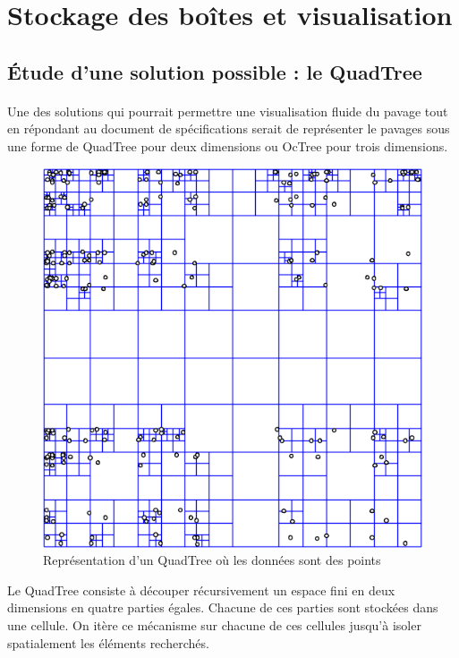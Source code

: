\section{Stockage des boîtes et visualisation}

\subsection{\'Etude d'une solution possible : le QuadTree}
\paragraph{}Une des solutions qui pourrait permettre une visualisation fluide du pavage tout en répondant au document de spécifications serait de représenter le pavages sous une forme de QuadTree pour deux dimensions ou OcTree pour trois dimensions.
\begin{figure}[htbp]
\centering
\includegraphics[scale=0.50]{img/quadtree}
\caption{Représentation d'un QuadTree où les données sont des points}

\end{figure}

Le QuadTree consiste à découper récursivement un espace fini en deux dimensions en quatre parties égales. Chacune de ces parties sont stockées dans une cellule. On itère ce mécanisme sur chacune de ces cellules jusqu'à isoler spatialement les éléments recherchés.

